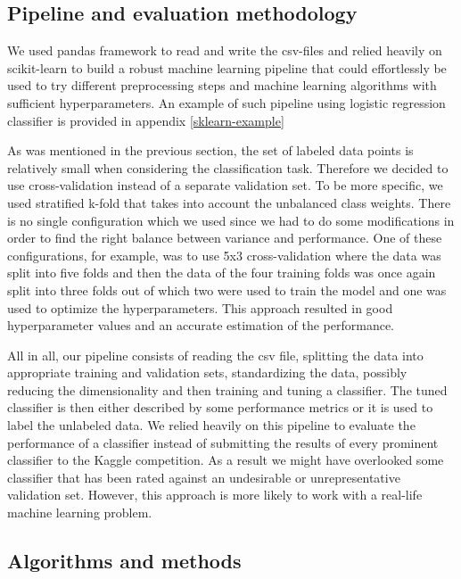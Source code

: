 \documentclass[fleqn,10pt]{SelfArx} %
\begin{document}
\subsection{Pipeline and evaluation methodology}

We used pandas framework to read and write the csv-files and relied
heavily on scikit-learn to build a robust machine learning pipeline that could
effortlessly be used to try different preprocessing steps and machine learning
algorithms with sufficient hyperparameters. An example of such pipeline using
logistic regression classifier is provided in appendix \ref{sklearn-example}

As was mentioned in the previous section, the set of labeled data points is
relatively small when considering the classification task. Therefore we decided
to use cross-validation instead of a separate validation set. To be more
specific, we used stratified k-fold that takes into account the
unbalanced class weights. There is no single configuration which we used since we
had to do some modifications in order to find the right balance between variance
and performance. One of these configurations, for example, was to use 5x3
cross-validation where the data was split into five folds and then the data of
the four training
folds was once again split into three folds out of which two were used to train the
model and one was used to optimize the hyperparameters. This approach resulted
in good hyperparameter values and an accurate estimation of the performance.

All in all, our pipeline consists of reading the csv file, splitting the data into
appropriate training and validation sets, standardizing the data, possibly reducing
the dimensionality and then training and tuning a classifier. The tuned
classifier is then either described by some performance metrics or it is used to
label the unlabeled data. We relied heavily on this pipeline to evaluate the
performance of a classifier instead of submitting the results of every
prominent classifier to the Kaggle competition. As a result we might have
overlooked some classifier that has been rated against an undesirable or
unrepresentative validation set. However, this approach is more likely to work
with a real-life machine learning problem.

\subsection{Algorithms and methods}
\end{document}
